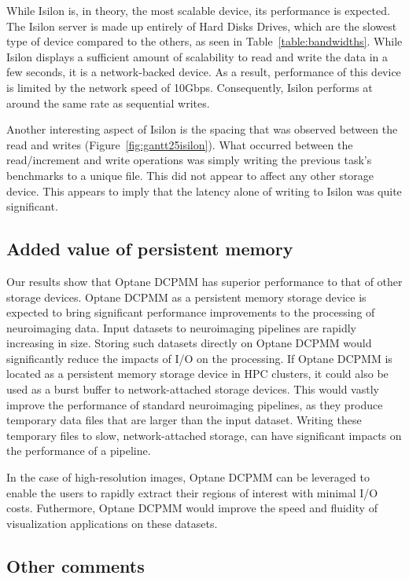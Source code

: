 \documentclass[conference]{IEEEtran}
\begin{document}
While Isilon is, in theory, the most scalable device, its performance is expected. The Isilon
server is made up entirely of Hard Disks Drives, which are the slowest type of device compared to
the others, as seen in Table~\ref{table:bandwidths}. While Isilon displays a sufficient amount of
scalability to read and write the data in a few seconds, it is a network-backed device. As a result,
performance of this device is limited by the network speed of 10Gbps. Consequently, Isilon performs at around
the same rate as sequential writes.

Another interesting aspect of Isilon is the spacing that was observed between the read and writes
(Figure~\ref{fig:gantt25isilon}). What occurred between the read/increment and
write operations was simply writing the previous task's benchmarks to a unique
file. This did not appear to affect any other storage device. This appears to imply
that the latency alone of writing to Isilon was quite significant.

\subsection{Added value of persistent memory}

Our results show that Optane DCPMM has superior performance to that of other storage devices.
Optane DCPMM as a persistent memory storage device is expected to bring significant
performance improvements to the processing of neuroimaging data. Input datasets to neuroimaging pipelines
are rapidly increasing in size. Storing such datasets directly on Optane DCPMM would significantly reduce the
impacts of I/O on the processing. If Optane DCPMM is located as a persistent memory
storage device in HPC clusters,
it could also be used as a burst buffer to network-attached storage devices. This would vastly
improve the performance of standard neuroimaging pipelines, as they produce temporary data files that 
are larger than the input dataset. Writing these temporary files to slow, network-attached storage, can have
significant impacts on the performance of a pipeline.

In the case of high-resolution images, Optane DCPMM can be leveraged to enable the users to rapidly
extract their regions of interest with minimal I/O costs. Futhermore, Optane DCPMM would improve the
speed and fluidity of visualization applications on these datasets.

\subsection{Other comments}
\end{document}
